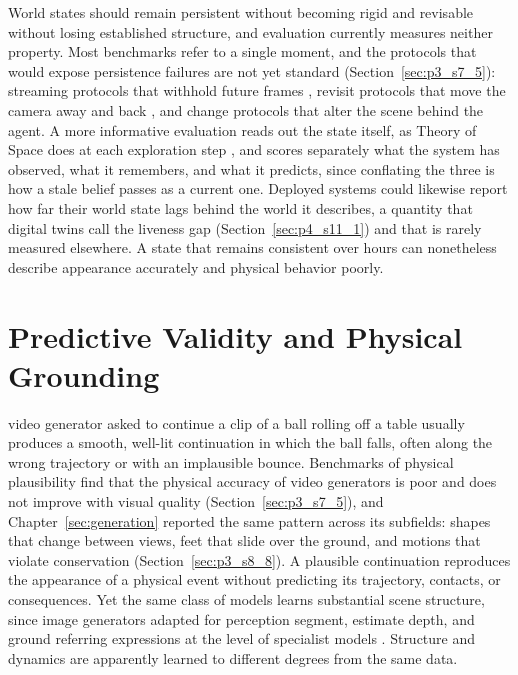 World states should remain persistent without becoming rigid and revisable without losing established structure, and evaluation currently measures neither property.
Most benchmarks refer to a single moment, and the protocols that would expose persistence failures are not yet standard (Section~\ref{sec:p3_s7_5}): streaming protocols that withhold future frames \cite{li2026ovosbench}, revisit protocols that move the camera away and back \cite{wang2026worldprobe}, and change protocols that alter the scene behind the agent.
A more informative evaluation reads out the state itself, as Theory of Space does at each exploration step \cite{zhang2026theory}, and scores separately what the system has observed, what it remembers, and what it predicts, since conflating the three is how a stale belief passes as a current one.
Deployed systems could likewise report how far their world state lags behind the world it describes, a quantity that digital twins call the liveness gap (Section~\ref{sec:p4_s11_1}) and that is rarely measured elsewhere.
A state that remains consistent over hours can nonetheless describe appearance accurately and physical behavior poorly.


\section{Predictive Validity and Physical Grounding}
\label{sec:p5_validity}
\label{sec:p5_plausible}

 video generator asked to continue a clip of a ball rolling off a table usually produces a smooth, well-lit continuation in which the ball falls, often along the wrong trajectory or with an implausible bounce.
Benchmarks of physical plausibility find that the physical accuracy of video generators is poor and does not improve with visual quality (Section~\ref{sec:p3_s7_5}), and Chapter~\ref{sec:generation} reported the same pattern across its subfields: shapes that change between views, feet that slide over the ground, and motions that violate conservation (Section~\ref{sec:p3_s8_8}).
A plausible continuation reproduces the appearance of a physical event without predicting its trajectory, contacts, or consequences.
Yet the same class of models learns substantial scene structure, since image generators adapted for perception segment, estimate depth, and ground referring expressions at the level of specialist models \cite{gabeur2026image}.
Structure and dynamics are apparently learned to different degrees from the same data.

